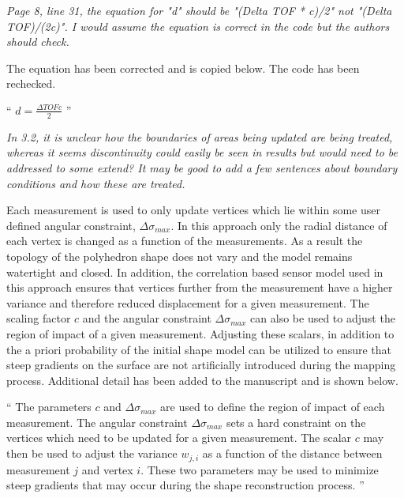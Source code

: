 \documentclass[11pt]{article}
\newenvironment{correction}{\begin{list}{}{\setlength{\leftmargin}{1cm}\setlength{\rightmargin}{1cm}}\vspace{\parsep}\item[]``}{''\end{list}}
\newcommand{\comment}[1]{\item \itshape #1 \normalfont}
\begin{document}
\begin{itemize}
\comment{
Page 8, line 31, the equation for "d" should be "(Delta TOF * c)/2" not "(Delta TOF)/(2c)". I would assume the equation is correct in the code but the authors should check.
}

The equation has been corrected and is copied below.
The code has been rechecked. 


\begin{correction}
    \(d = \frac{\Delta TOF c}{2} \) 
\end{correction}

\comment{
In 3.2, it is unclear how the boundaries of areas being updated are being treated, whereas it seems discontinuity could easily be seen in results but would need to be addressed to some extend? 
It may be good to add a few sentences about boundary conditions and how these are treated.
}

Each measurement is used to only update vertices which lie within some user defined angular constraint, \( \Delta \sigma_{max} \).
In this approach only the radial distance of each vertex is changed as a function of the measurements. 
As a result the topology of the polyhedron shape does not vary and the model remains watertight and closed.
In addition, the correlation based sensor model used in this approach ensures that vertices further from the measurement have a higher variance and therefore reduced displacement for a given measurement. 
The scaling factor \( c \) and the angular constraint \( \Delta \sigma_{max} \) can also be used to adjust the region of impact of a given measurement. 
Adjusting these scalars, in addition to the a priori probability of the initial shape model can be utilized to ensure that steep gradients on the surface are not artificially introduced during the mapping process.
Additional detail has been added to the manuscript and is shown below.


\begin{correction}
    The parameters \( c \) and \( \Delta \sigma_{max} \) are used to define the region of impact of each measurement. 
    The angular constraint \( \Delta \sigma_{max} \) sets a hard constraint on the vertices which need to be updated for a given measurement.
    The scalar \( c \) may then be used to adjust the variance \( w_{j,i} \) as a function of the distance between measurement \( j \) and vertex \( i \).
    These two parameters may be used to minimize steep gradients that may occur during the shape reconstruction process.
\end{correction}


\end{itemize}
\end{document}
